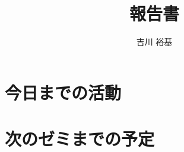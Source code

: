 \documentclass[12pt,a4paper]{article}
\title{報告書}
\date{}
\author{吉川 裕基}
\begin{document}
\maketitle
\section{今日までの活動}

\section{次のゼミまでの予定}
\end{document}
